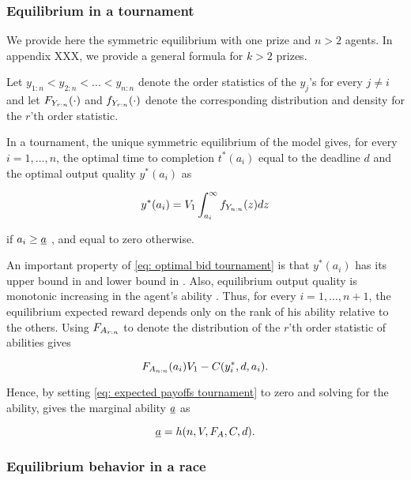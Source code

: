 \documentclass[12pt, titlepage, draft]{article} \usepackage[utf8]{inputenc}                           \usepackage[english]{babel}                           \usepackage{amsmath,amssymb,amsfonts}                 \usepackage{xcolor,tikz,graphicx,subfig}              \usepackage{rotating,multirow,array,dcolumn,booktabs} \usepackage{natbib}                                   
\begin{document}
\subsubsection{Equilibrium in a
tournament}\label{equilibrium-in-a-tournament}

We provide here the symmetric equilibrium with one prize
 and \(n>2\) agents. In appendix XXX, we provide
a general formula for \(k>2\) prizes.

Let \(y_{1:n} < y_{2:n} < ... < y_{n:n}\) denote the order statistics of
the \(y_j\)'s for every \(j\neq i\) and let \(\pord[Y]{r}(\cdot)\) and
\(\dord[Y]{r}(\cdot)\) denote the corresponding distribution and density
for the \(r\)'th order statistic.

In a tournament, the unique symmetric equilibrium of the model gives,
for every \(i=1, ..., n\), the optimal time to completion \(t^*(a_i)\)
equal to the deadline \(d\) and the optimal output quality \(y^*(a_i)\)
as

\begin{equation}
  \label{eq: optimal bid tournament}
  y^*(a_i) =  V_1 \int_{a_i}^\infty \dord[Y]{n} (z) dz
\end{equation}

if \(\ability \geq \marginaltype\) \citep[see][]{moldovanu2001optimal},
and equal to zero otherwise.

An important property of \eqref{eq: optimal bid tournament} is that
\(y^*(a_i)\) has its upper bound in  and lower bound in
. Also, equilibrium output quality is monotonic increasing
in the agent's ability \citep[see][]{moldovanu2001optimal}. Thus, for
every \(i=1, ..., n+1\), the equilibrium expected reward depends only on
the rank of his ability relative to the others. Using \(\pord[A]{r}\) to
denote the distribution of the \(r\)'th order statistic of abilities
gives

\begin{equation}
  \label{eq: expected payoffs tournament}
  \pord[A]{n}(a_i) V_1  - C(y_i^*, d, a_i).
\end{equation}

Hence, by setting \eqref{eq: expected payoffs tournament} to zero and
solving for the ability, gives the marginal ability \(\marginaltype\) as

\begin{equation}
  \marginaltype = h(n, V, F_A, C, d). 
\end{equation}

\subsubsection{Equilibrium behavior in a
race}\label{equilibrium-behavior-in-a-race}
\end{document}
